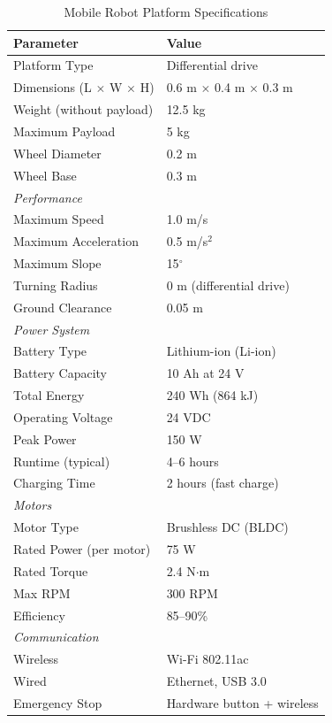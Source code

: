 \begin{table}[htbp]
\centering
\caption{Mobile Robot Platform Specifications}
\label{tab:robot_platform}
\begin{tabular}{@{}ll@{}}
\toprule
\textbf{Parameter} & \textbf{Value} \\
\midrule
Platform Type & Differential drive \\
Dimensions (L $\times$ W $\times$ H) & 0.6 m $\times$ 0.4 m $\times$ 0.3 m \\
Weight (without payload) & 12.5 kg \\
Maximum Payload & 5 kg \\
Wheel Diameter & 0.2 m \\
Wheel Base & 0.3 m \\
\midrule
\multicolumn{2}{l}{\textit{Performance}} \\
Maximum Speed & 1.0 m/s \\
Maximum Acceleration & 0.5 m/s$^2$ \\
Maximum Slope & 15$^\circ$ \\
Turning Radius & 0 m (differential drive) \\
Ground Clearance & 0.05 m \\
\midrule
\multicolumn{2}{l}{\textit{Power System}} \\
Battery Type & Lithium-ion (Li-ion) \\
Battery Capacity & 10 Ah at 24 V \\
Total Energy & 240 Wh (864 kJ) \\
Operating Voltage & 24 VDC \\
Peak Power & 150 W \\
Runtime (typical) & 4--6 hours \\
Charging Time & 2 hours (fast charge) \\
\midrule
\multicolumn{2}{l}{\textit{Motors}} \\
Motor Type & Brushless DC (BLDC) \\
Rated Power (per motor) & 75 W \\
Rated Torque & 2.4 N$\cdot$m \\
Max RPM & 300 RPM \\
Efficiency & 85--90\% \\
\midrule
\multicolumn{2}{l}{\textit{Communication}} \\
Wireless & Wi-Fi 802.11ac \\
Wired & Ethernet, USB 3.0 \\
Emergency Stop & Hardware button + wireless \\
\bottomrule
\end{tabular}
\end{table}

